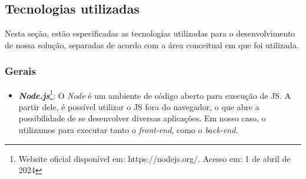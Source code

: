 



\subsection{Tecnologias utilizadas}
Nesta seção, estão especificadas as tecnologias utilizadas para o desenvolvimento de nossa solução, separadas de acordo com a área conceitual em que foi utilizada.

\subsubsection{Gerais}
\begin{itemize}
    \item \textbf{\textit{Node.js}}\footnote{Website oficial disponível em: https://nodejs.org/. Acesso em: 1 de abril de 2024}: O \textit{Node} é um ambiente de código aberto para execução de JS. A partir dele, é possível utilizar o JS fora do navegador, o que abre a possibilidade de se desenvolver diversas aplicações. Em nosso caso, o utilizamos para executar tanto o \textit{front-end}, como o \textit{back-end}.
\end{itemize}

